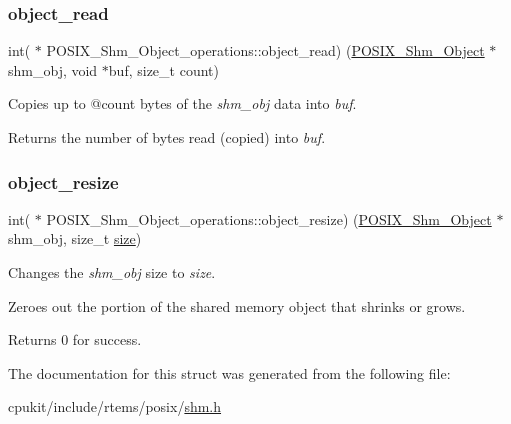 \subsubsection{\texorpdfstring{object\_read}{object\_read}}
{\footnotesize\ttfamily int( $\ast$ P\+O\+S\+I\+X\+\_\+\+Shm\+\_\+\+Object\+\_\+operations\+::object\+\_\+read) (\mbox{\hyperlink{structPOSIX__Shm__Object}{P\+O\+S\+I\+X\+\_\+\+Shm\+\_\+\+Object}} $\ast$shm\+\_\+obj, void $\ast$buf, size\+\_\+t count)}



Copies up to @count bytes of the {\itshape shm\+\_\+obj} data into {\itshape buf}. 

Returns the number of bytes read (copied) into {\itshape buf}. \mbox{\label{structPOSIX__Shm__Object__operations_adc4a14e2eddd68f82f851e458ff1420f}} 
\subsubsection{\texorpdfstring{object\_resize}{object\_resize}}
{\footnotesize\ttfamily int( $\ast$ P\+O\+S\+I\+X\+\_\+\+Shm\+\_\+\+Object\+\_\+operations\+::object\+\_\+resize) (\mbox{\hyperlink{structPOSIX__Shm__Object}{P\+O\+S\+I\+X\+\_\+\+Shm\+\_\+\+Object}} $\ast$shm\+\_\+obj, size\+\_\+t \mbox{\hyperlink{sun4u_2tte_8h_a245260f6f74972558f61b85227df5aae}{size}})}



Changes the {\itshape shm\+\_\+obj} size to {\itshape size}. 

Zeroes out the portion of the shared memory object that shrinks or grows.

Returns 0 for success. 

The documentation for this struct was generated from the following file\+:\begin{DoxyCompactItemize}
\item 
cpukit/include/rtems/posix/\mbox{\hyperlink{shm_8h}{shm.\+h}}\end{DoxyCompactItemize}
